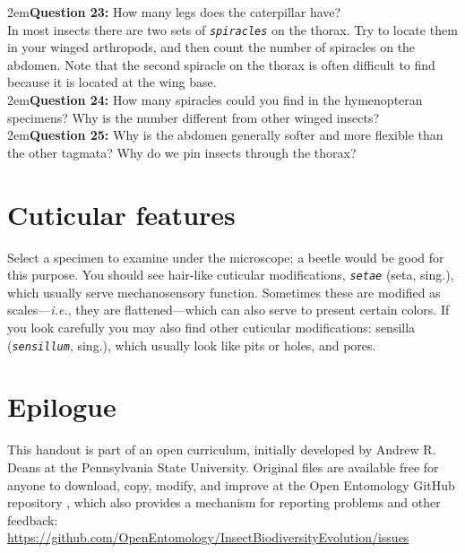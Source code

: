 \documentclass[letterpaper, 11pt]{article}
\newcommand{\latinword}[1]{\texttt{\itshape #1}}%
\begin{document}
\hangindent2em\textbf{Question 23:} How many legs does the caterpillar have?  \\

\noindent{}In most insects there are two sets of \latinword{spiracles} on the thorax. Try to locate them in your winged arthropods, and then count the number of spiracles on the abdomen. Note that the second spiracle on the thorax is often difficult to find because it is located at the wing base. \\

\hangindent2em\textbf{Question 24:} How many spiracles could you find in the hymenopteran specimens? Why is the number different from other winged insects?\\

\hangindent2em\textbf{Question 25:} Why is the abdomen generally softer and more flexible than the other tagmata? Why do we pin insects through the thorax?\\

\section{Cuticular features}

\noindent{}Select a specimen to examine under the microscope; a beetle would be good for this purpose. You should see hair-like cuticular modifications, \latinword{setae} (seta, sing.), which usually serve mechanosensory function. Sometimes these are modified as scales---\textit{i.e.}, they are flattened---which can also serve to present certain colors. If you look carefully you may also find other cuticular modifications: sensilla (\latinword{sensillum}, sing.), which usually look like pits or holes, and pores.

\clearpage
\section*{Epilogue}
This handout is part of an open curriculum, initially developed by Andrew R. Deans at the Pennsylvania State University. Original files are available free for anyone to download, copy, modify, and improve at the Open Entomology GitHub repository \citep{ENT532}, which also provides a mechanism for reporting problems and other feedback:\\
\url{https://github.com/OpenEntomology/InsectBiodiversityEvolution/issues}




\end{document}
